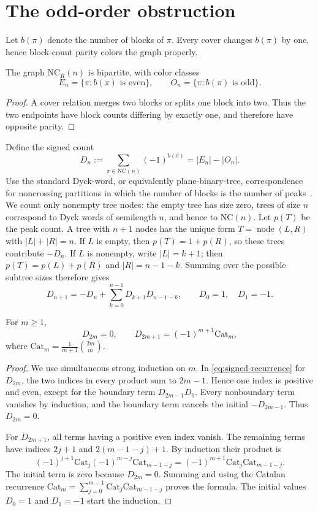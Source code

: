 \documentclass[12pt]{article}
\newcommand{\NCR}{\mathrm{NC}_R}
\newcommand{\NC}{\mathrm{NC}}
\newcommand{\catalan}{\mathrm{Cat}}
\begin{document}
\section{The odd-order obstruction}\label{sec:odd}

Let $b(\pi)$ denote the number of blocks of $\pi$.  Every cover changes
$b(\pi)$ by one, hence block-count parity colors the graph properly.

\begin{lemma}\label{lem:bipartite}
The graph $\NCR(n)$ is bipartite, with color classes
\[
 E_n=\{\pi:b(\pi)\text{ is even}\},\qquad
 O_n=\{\pi:b(\pi)\text{ is odd}\}.
\]
\end{lemma}

\begin{proof}
A cover relation merges two blocks or splits one block into two.  Thus the
two endpoints have block counts differing by exactly one, and therefore have
opposite parity.
\end{proof}

Define the signed count
\[
 D_n:=\sum_{\pi\in\NC(n)}(-1)^{b(\pi)}=|E_n|-|O_n|.
\]
Use the standard Dyck-word, or equivalently plane-binary-tree,
correspondence for noncrossing partitions in which the number of blocks is
the number of peaks~\cite{S,SU}.  We count only nonempty tree nodes: the empty
tree has size zero, trees of size $n$ correspond to Dyck words of semilength
$n$, and hence to $\NC(n)$.  Let $p(T)$ be the peak count.  A tree with $n+1$
nodes has the unique form $T=\operatorname{node}(L,R)$ with
$|L|+|R|=n$.  If $L$ is empty, then $p(T)=1+p(R)$, so these trees contribute
$-D_n$.  If $L$ is nonempty, write $|L|=k+1$; then
$p(T)=p(L)+p(R)$ and $|R|=n-1-k$.  Summing over the possible subtree sizes
therefore gives
\begin{equation}\label{eq:signed-recurrence}
 D_{n+1}=-D_n+\sum_{k=0}^{n-1}D_{k+1}D_{n-1-k},
 \qquad D_0=1,\quad D_1=-1.
\end{equation}

\begin{theorem}\label{thm:signed-count}
For $m\geq1$,
\[
 D_{2m}=0,
 \qquad
 D_{2m+1}=(-1)^{m+1}\catalan_m,
\]
where $\catalan_m=\frac1{m+1}\binom{2m}{m}$.
\end{theorem}

\begin{proof}
We use simultaneous strong induction on $m$.  In
\eqref{eq:signed-recurrence} for $D_{2m}$, the two indices in every product
sum to $2m-1$.  Hence one index is positive and even, except for the boundary
term $D_{2m-1}D_0$.  Every nonboundary term vanishes by induction, and the
boundary term cancels the initial $-D_{2m-1}$.  Thus $D_{2m}=0$.

For $D_{2m+1}$, all terms having a positive even index vanish.  The remaining
terms have indices $2j+1$ and $2(m-1-j)+1$.  By induction their product is
\[
 (-1)^{j+1}\catalan_j
 (-1)^{m-j}\catalan_{m-1-j}
 =(-1)^{m+1}\catalan_j\catalan_{m-1-j}.
\]
The initial term is zero because $D_{2m}=0$.  Summing and using the Catalan
recurrence
$\catalan_m=\sum_{j=0}^{m-1}\catalan_j\catalan_{m-1-j}$ proves the formula.
The initial values $D_0=1$ and $D_1=-1$ start the induction.
\end{proof}
\end{document}
